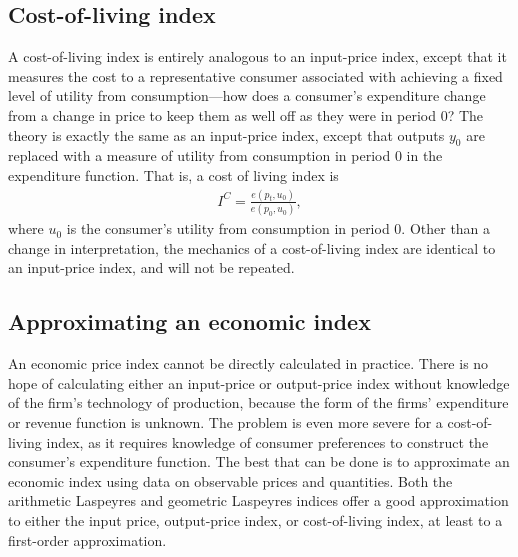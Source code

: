 \documentclass[
]{article}
\begin{document}
\hypertarget{cost-of-living-index}{%
\subsection{Cost-of-living index}\label{cost-of-living-index}}

A cost-of-living index is entirely analogous to an input-price index, except that it measures the cost to a representative consumer associated with achieving a fixed level of utility from consumption---how does a consumer's expenditure change from a change in price to keep them as well off as they were in period 0? The theory is exactly the same as an input-price index, except that outputs \(y_0\) are replaced with a measure of utility from consumption in period 0 in the expenditure function. That is, a cost of living index is
\begin{align*}
I^{C} = \frac{e(p_{t}, u_{0})}{e(p_{0}, u_{0})},
\end{align*}
where \(u_{0}\) is the consumer's utility from consumption in period 0. Other than a change in interpretation, the mechanics of a cost-of-living index are identical to an input-price index, and will not be repeated.

\hypertarget{approximating-an-economic-index}{%
\subsection{Approximating an economic index}\label{approximating-an-economic-index}}

An economic price index cannot be directly calculated in practice. There is no hope of calculating either an input-price or output-price index without knowledge of the firm's technology of production, because the form of the firms' expenditure or revenue function is unknown. The problem is even more severe for a cost-of-living index, as it requires knowledge of consumer preferences to construct the consumer's expenditure function. The best that can be done is to approximate an economic index using data on observable prices and quantities. Both the arithmetic Laspeyres and geometric Laspeyres indices offer a good approximation to either the input price, output-price index, or cost-of-living index, at least to a first-order approximation.
\end{document}

